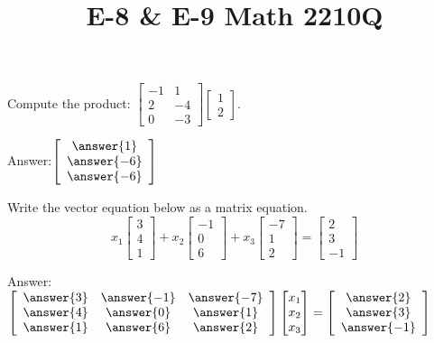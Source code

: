 \documentclass{ximera}
\begin{document}
  	\title{E-8 \& E-9  \hfill Math 2210Q} 

  	
  
 

  	 	\begin{question}
  
  	Compute the product: $	\begin{bmatrix}
  			-1 &1\\2&-4\\0 &-3
  		\end{bmatrix} \begin{bmatrix}
  		1 \\2
  		\end{bmatrix}$.
  		
  		Answer:$ \left[\begin{array}{c}
  	\answer{1}\\\answer{-6}\\ \answer{-6}
  		\end{array}\right]$
  	
  		\end{question}
  		
  		\begin{question} Write the vector equation below as a matrix equation.\\
  	$$x_1\begin{bmatrix}
  	3\\4\\1
  	\end{bmatrix} +x_2 \begin{bmatrix}
  	-1\\0\\6
  	\end{bmatrix}+x_3\begin{bmatrix}
  -7\\1\\2
  	\end{bmatrix} =\begin{bmatrix}
  2\\3\\-1
  	\end{bmatrix}$$
  	
  	Answer: $\left[ \begin{array}{ccc} \answer{3} & \answer{-1} & \answer{-7} \\
  	\answer{4} & \answer{0} & \answer{1} \\ \answer{1} & \answer{6} & \answer{2} \\ \end{array} \right] \begin{bmatrix} x_1\\ x_2\\ x_3 \end{bmatrix} = \left[ \begin{array}{c} \answer{2}\\ \answer{3}\\ \answer{-1} \end{array} \right]$
  	
  		
  	\end{question}
  	
\end{document}
